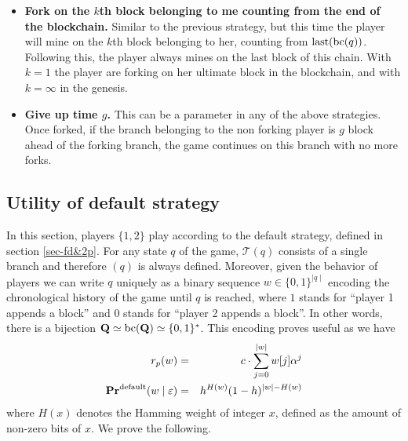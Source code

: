 \begin{itemize}
\item {\bf Fork on the $k$th block belonging to me counting from the end of the blockchain.} Similar to the previous strategy, but this time the player will mine on the $k$th block belonging to her, counting from $\text{\rm last}(\text{bc}(q))$. Following this, the player always mines on the last block of this chain. With $k=1$ the player are forking on her ultimate block in the blockchain, and with $k=\infty$ in the genesis.

\item {\bf Give up time $g$.} This can be a parameter in any of the above strategies. Once forked, if the branch belonging to the non forking player is $g$ block ahead of the forking branch, the game continues on this branch with no more forks.
\end{itemize}


\subsection{Utility of default strategy}
In this section, players $\{1,2\}$ play according to the default strategy, defined in section \ref{sec-fd&2p}. For any state $q$ of the game, $\mathcal{T}(q)$ consists of a single branch and therefore \bchain$(q)$ is always defined. Moreover, given the behavior of players we can write $q$ uniquely as a binary sequence $w\in\{0,1\}^{\mid q\mid }$ encoding the chronological history of the game until $q$ is reached, where $1$ stands for ``player 1 appends a block'' and $0$ stands for ``player 2 appends a block''. In other words, there is a bijection $ \mathbf{Q} \simeq\text{bc}(\mathbf{Q})\simeq \{0,1\}^\ast$. This encoding proves useful as we have
\begin{eqnarray*}
	r_p(w) &=&	c\cdot \sum_{j=0}^{\mid w\mid}w[j] \alpha^j  \\
	\mathbf{Pr}^{\text{\rm default}}(w \mid \varepsilon) &=&	h^{H(w)}(1-h)^{|w|-H(w)}
\end{eqnarray*}
where $H(x)$ denotes the Hamming weight of integer $x$, defined as the amount of non-zero bits of $x$. We prove the following.


